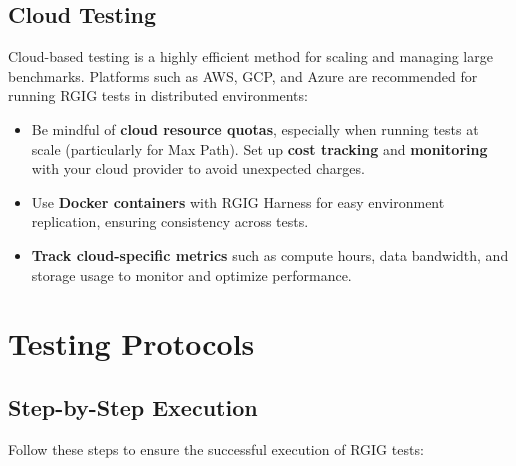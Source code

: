 \subsection*{Cloud Testing}
Cloud-based testing is a highly efficient method for scaling and managing large benchmarks. Platforms such as AWS, GCP, and Azure are recommended for running RGIG tests in distributed environments:
\begin{itemize}
  \item Be mindful of \textbf{cloud resource quotas}, especially when running tests at scale (particularly for Max Path). Set up \textbf{cost tracking} and \textbf{monitoring} with your cloud provider to avoid unexpected charges.
  \item Use \textbf{Docker containers} with RGIG Harness for easy environment replication, ensuring consistency across tests.
  \item \textbf{Track cloud-specific metrics} such as compute hours, data bandwidth, and storage usage to monitor and optimize performance.
\end{itemize}

\section*{Testing Protocols}

\subsection*{Step-by-Step Execution}
Follow these steps to ensure the successful execution of RGIG tests:

